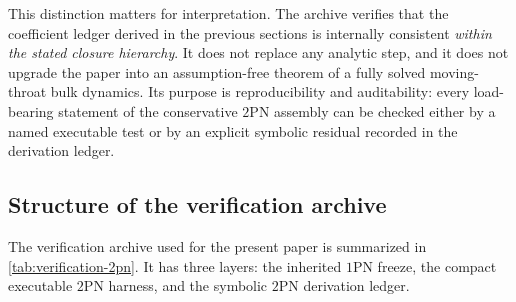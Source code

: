 \documentclass[11pt]{article}
\newcommand{\OnePN}{\mathrm{1PN}}
\newcommand{\TwoPN}{\mathrm{2PN}}
\begin{document}
This distinction matters for interpretation.
The archive verifies that the coefficient ledger derived in the previous sections is
internally consistent \emph{within the stated closure hierarchy}.  It does not replace
any analytic step, and it does not upgrade the paper into an assumption-free theorem of
a fully solved moving-throat bulk dynamics.  Its purpose is reproducibility and
auditability: every load-bearing statement of the conservative \(\TwoPN\) assembly can be
checked either by a named executable test or by an explicit symbolic residual recorded in
the derivation ledger.

\subsection{Structure of the verification archive}
\label{sec:verification-archive}

The verification archive used for the present paper is summarized in
\cref{tab:verification-2pn}.  It has three layers: the inherited \(\OnePN\) freeze, the
compact executable \(\TwoPN\) harness, and the symbolic \(\TwoPN\) derivation ledger.
\end{document}
